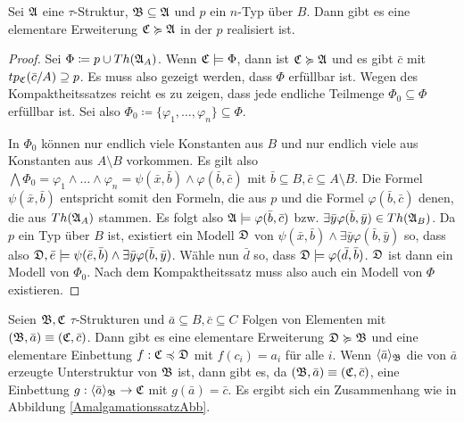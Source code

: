 \begin{lemma}
	Sei $\mathfrak{A}$ eine $\tau$-Struktur, $\mathfrak{B}\subseteq\mathfrak{A}$ und $p$ ein $n$-Typ über $B$. Dann gibt es eine elementare Erweiterung $\mathfrak{C}\succcurlyeq\mathfrak{A}$ in der $p$ realisiert ist.
\end{lemma}
\begin{proof}
	Sei $\Phi\coloneqq p \cup Th(\mathfrak{A}_A)$. Wenn $\mathfrak{C}\models\Phi$, dann ist $\mathfrak{C}\succcurlyeq\mathfrak{A}$ und es gibt $\bar{c}$ mit $tp_{\mathfrak{C}}(\bar{c}/A)\supseteq p$. Es muss also gezeigt werden, dass $\Phi$ erfüllbar ist. Wegen des Kompaktheitssatzes reicht es zu zeigen, dass jede endliche Teilmenge $\Phi_0\subseteq \Phi$ erfüllbar ist. Sei also $\Phi_0\coloneqq\{\varphi_1,\dots,\varphi_n\}\subseteq\Phi$.
	
	In $\Phi_0$ können nur endlich viele Konstanten aus $B$ und nur endlich viele aus Konstanten aus $A\setminus B$ vorkommen. Es gilt also $\bigwedge\Phi_0=\varphi_1\land\dots\land\varphi_n=\psi(\bar{x},\bar{b})\land\varphi(\bar{b},\bar{c})$ mit $\bar{b}\subseteq B,\bar{c}\subseteq A\setminus B$. 
	Die Formel $\psi(\bar{x},\bar{b})$ entspricht somit den Formeln, die aus $p$ und die Formel $\varphi(\bar{b},\bar{c})$ denen, die aus $Th(\mathfrak{A}_A)$ stammen. Es folgt also $\mathfrak{A}\models\varphi(\bar{b},\bar{c})$ bzw. $\exists\bar{y}\varphi(\bar{b},\bar{y})\in Th(\mathfrak{A}_B)$. 
	Da $p$ ein Typ über $B$ ist, existiert ein Modell $\mathfrak{D}$ von $\psi(\bar{x},\bar{b})\land\exists\bar{y}\varphi(\bar{b},\bar{y})$ so, dass also $\mathfrak{D},\bar{e}\models \psi(\bar{e},\bar{b})\land\exists\bar{y}\varphi(\bar{b},\bar{y})$.
	Wähle nun $\bar{d}$ so, dass $\mathfrak{D}\models\varphi(\bar{d},\bar{b})$. $\mathfrak{D}$ ist dann ein Modell von $\Phi_0$. Nach dem Kompaktheitssatz muss also auch ein Modell von $\Phi$ existieren.
\end{proof}

\begin{satz}[Amalgamationssatz]
	Seien $\mathfrak{B},\mathfrak{C}$ $\tau$-Strukturen und $\bar{a}\subseteq B,\bar{c}\subseteq C$ Folgen von Elementen mit $(\mathfrak{B},\bar{a})\equiv(\mathfrak{C},\bar{c})$. Dann gibt es eine elementare Erweiterung $\mathfrak{D}\succcurlyeq\mathfrak{B}$ und eine elementare Einbettung $f:\mathfrak{C}\preccurlyeq\mathfrak{D}$ mit $f(c_i)=a_i$ für alle $i$. 
	Wenn $\langle\bar{a}\rangle_{\mathfrak{B}}$ die von $\bar{a}$ erzeugte Unterstruktur von $\mathfrak{B}$ ist, dann gibt es, da $(\mathfrak{B},\bar{a})\equiv(\mathfrak{C},\bar{c})$, eine Einbettung $g:\langle\bar{a}\rangle_{\mathfrak{B}}\to\mathfrak{C}$ mit $g(\bar{a})=\bar{c}$. Es ergibt sich ein Zusammenhang wie in Abbildung \ref{AmalgamationssatzAbb}.
	\label{Amalgamationssatz}
\end{satz}

